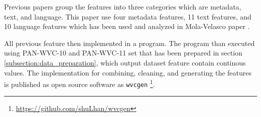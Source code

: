 Previous papers group the features into three categories which are metadata,
text, and language.
This paper use four metadata features, 11 text features, and 10
language features which has been used and analyzed in Mola-Velasco paper
\cite{mola2012wikipedia}.

All previous feature then implemented in a program.
The program than executed using PAN-WVC-10 and PAN-WVC-11 set that has been
prepared in section \ref{subsection:data_preparation}, which output dataset
feature contain continous values.
The implementation for combining, cleaning, and generating the features is
published as open source software as \texttt{wvcgen}
\footnote{\url{https://github.com/shuLhan/wvcgen}}.
